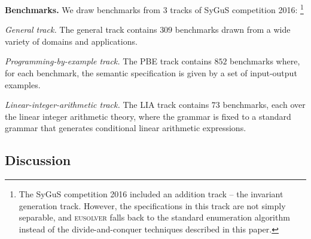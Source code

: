 \documentclass{llncs}
\newcommand{\sygus}{{\sffamily\fontsize{8.5}{10}\selectfont
    SyGuS}\xspace}
\newcommand{\dcsolve}{{\sffamily\fontsize{8.5}{10}\selectfont
    DCSolve}\xspace}
\renewcommand{\paragraph}[1]{\par\noindent\textbf{#1.}}
\newcommand{\eusolver}{\textsc{eusolver}\xspace}
\begin{document}


\paragraph{Benchmarks}
We draw benchmarks from $3$ tracks of \sygus
competition 2016:
\footnote{The \sygus competition 2016 included an addition track -- the
invariant generation track. 
However, the specifications in this track are not simply separable, and
\eusolver falls back to the standard enumeration algorithm instead of
the divide-and-conquer techniques described in this paper.
}
\begin{compactitem}[(a)]
\item {\em General track.} The general track contains $309$ benchmarks
  drawn from a wide variety of domains and applications.
\item {\em Programming-by-example track.} The PBE track contains $852$
  benchmarks where, for each benchmark, the semantic specification is
  given by a set of input-output examples.
\item {\em Linear-integer-arithmetic track.} The LIA track contains $73$
  benchmarks, each over the linear integer arithmetic theory, where the
  grammar is fixed to a standard grammar that generates conditional
  linear arithmetic expressions.
\end{compactitem}


\vspace*{-3mm}
\subsection{Discussion}
\end{document}
